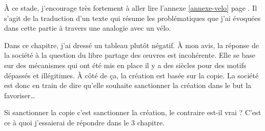 À ce stade, j'encourage très fortement à aller lire l'annexe \ref*{annexe-velo} page \pageref{annexe-velo}.
Il s'agit de la traduction d'un texte qui résume les problématiques que j'ai évoquées dans cette partie à travers une analogie avec un vélo.

\vspace{50pt}

Dans ce chapitre, j'ai dressé un tableau plutôt négatif.
À mon avis, la réponse de la société à la question du libre partage des œuvres est incohérente.
Elle se base sur des mécanismes qui ont été mis en place il y a des siècles pour des motifs dépassés et illégitimes.
À côté de ça, la création est basée sur la copie.
La société est donc en train de dire qu'elle souhaite sanctionner la création dans le but la favoriser\dots{}

Si sanctionner la copie c'est sanctionner la création, le contraire est-il vrai ?
C'est ce à quoi j'essaierai de répondre dans le 3\ieme{} chapitre.
